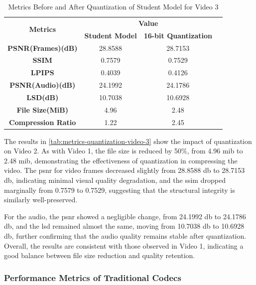 \documentclass{ioereport}
\begin{document}
    \begin{table}[H]
        \centering
        \caption{Metrics Before and After Quantization of Student Model for Video 3}
        \label{tab:metrics-quantization-video-3}
        \begin{tabular}{|c|c|c|c|}
            \hline
            \multirow{2}{*}{\textbf{Metrics}} & \multicolumn{2}{c|}{\textbf{Value}} \\ \cline{2-3}
            & \textbf{Student Model} & \textbf{16-bit Quantization} \\ \hline
            \textbf{PSNR(Frames)(dB)} & 28.8588 & 28.7153 \\ \hline
            \textbf{SSIM} & 0.7579 & 0.7529 \\ \hline
            \textbf{LPIPS} & 0.4039 & 0.4126 \\ \hline
            \textbf{PSNR(Audio)(dB)} & 24.1992 & 24.1786 \\ \hline
            \textbf{LSD(dB)} & 10.7038 & 10.6928 \\ \hline
            \textbf{File Size(MiB)} & 4.96 & 2.48 \\ \hline
            \textbf{Compression Ratio} & 1.22 & 2.45\\ \hline
        \end{tabular}
    \end{table}

    The results in \autoref{tab:metrics-quantization-video-3} show the impact of quantization on Video 2. As with Video 1, the file size is reduced by 50\%, from 4.96 \gls{mib} to 2.48 \gls{mib}, demonstrating the effectiveness of quantization in compressing the video. The \gls{psnr} for video frames decreased slightly from 28.8588 \gls{db} to 28.7153 \gls{db}, indicating minimal visual quality degradation, and the \gls{ssim} dropped marginally from 0.7579 to 0.7529, suggesting that the structural integrity is similarly well-preserved.

    For the audio, the \gls{psnr} showed a negligible change, from 24.1992 \gls{db} to 24.1786 \gls{db}, and the \gls{lsd} remained almost the same, moving from 10.7038 \gls{db} to 10.6928 \gls{db}, further confirming that the audio quality remains stable after quantization. Overall, the results are consistent with those observed in Video 1, indicating a good balance between file size reduction and quality retention.


    \subsubsection{Performance Metrics of Traditional Codecs}
\end{document}
